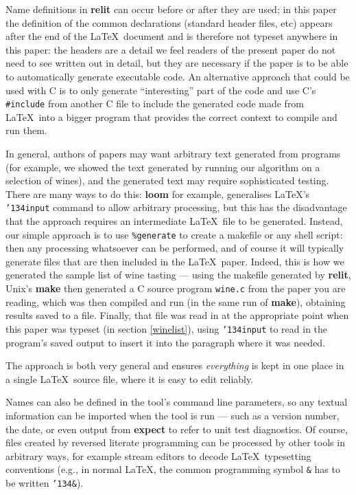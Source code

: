 \documentclass[12pt]{article}
\def\name#1{\textbf{#1}}
\begin{document}
Name definitions in \name{relit} can occur before or after they are used; in this paper the definition of the common declarations (standard header files, etc) appears after the end of the \LaTeX\ document and is therefore not typeset anywhere in this paper: the headers are a detail we feel readers of the present paper do not need to see written out in detail, but they are necessary if the paper is to be able to automatically generate executable code. An alternative approach that could be used with C is to only generate ``interesting'' part of the code and use C's \texttt{\#include} from another C file to include the generated code made from \LaTeX\ into a bigger program that provides the correct context to compile and run them.

In general, authors of papers may want arbitrary text generated from programs (for example, we showed the text generated by running our algorithm on a selection of wines), and the generated text may require sophisticated testing. There are many ways to do this: \name{loom} for example, generalises \LaTeX's \texttt{\char'134input} command to allow arbitrary processing, but this has the disadvantage that the approach requires an intermediate \LaTeX\ file to be generated. Instead, our simple approach is to use \texttt{\%{}generate} to create a makefile or any shell script: then any processing whatsoever can be performed, and of course it will typically generate files that are then included in the \LaTeX\ paper. Indeed, this is how we generated the sample list of wine tasting --- using the makefile generated by \name{relit}, Unix's \name{make} then generated a C source program \texttt{wine.c} from the paper you are reading, which was then compiled and run (in the same run of \name{make}), obtaining results saved to a file. Finally, that file was read in at the appropriate point when this paper was typeset (in section \ref{winelist}), using \texttt{\char'134input} to read in the program's saved output to insert it into the paragraph where it was needed. 

The approach is both very general and ensures \emph{everything\/} is kept in one place in a single \LaTeX\ source file, where it is easy to edit reliably. 

Names can also be defined in the tool's command line parameters, so any textual information can be imported when the tool is run --- such as a version number, the date, or even output from \name{expect} to refer to unit test diagnostics. Of course, files created by reversed literate programming can be processed by other tools in arbitrary ways, for example stream editors to decode \LaTeX\ typesetting conventions (e.g., in normal \LaTeX, the common programming symbol \texttt{\&} has to be written \texttt{\char'134\&}).
\end{document}
